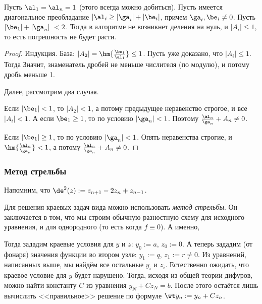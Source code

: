 \documentclass[a4paper]{article}
\begin{document}
\begin{theorem}
Пусть $\al_1 = \al_n=1$ (этого всегда можно добиться). Пусть имеется диагональное преобладание
$|\al_i \ge |\ga_i| + |\be_i|$, причем $\ga_i, \be_i \neq 0$. Пусть $|\be_1| + |\ga_n|\ < 2$.
Тогда в алгоритме не возникнет деления на нуль, и $|A_i|\le 1$, то есть погрешность не будет расти.
\end{theorem}
\begin{proof}
Индукция. База: $|A_2| = \hm{\frac {\be_1}{\al_1}} \le 1$. Пусть уже доказано, что $|A_i|\le1$. Тогда
Значит, знаменатель дробей не меньше числителя (по модулю), и потому дробь меньше 1.

Далее, рассмотрим два случая.

 Если $|\be_1| < 1$, то $|A_2| <1$, а потому предыдущее неравенство строгое, и все $|A_i| < 1$.
А если $\be_1 \ge 1$, то по условию $|\ga_n| < 1$. Поэтому $\frac{\al_n}{\ga_n} + A_n \neq 0$.

 Если $|\be_1| \ge 1$, то по условию $|\ga_n| < 1$. Опять неравенства строгие, и $\hm{\frac{\al_n}{\ga_n}}<1$,
а потому $\frac{\al_n}{\ga_n} + A_n \neq 0$.
\end{proof}

\subsubsection{Метод стрельбы}

Напомним, что $\de^2 (z) := z_{n+1}-2z_n + z_{n-1}$.

Для решения краевых задач вида
можно использовать \emph{метод стрельбы}.
Он заключается в том, что мы строим обычную разностную схему для исходного уравнения, и для однородного (то есть когда $f\equiv 0$).
А именно,

Тогда зададим краевые условия для $y$ и $z$: $y_0 := a$, $z_0 := 0$.
А теперь зададим (от фонаря) значения функции во втором узле:
$y_1 := q$, $z_1 := r \ne 0$.
Из уравнений, написанных выше, мы найдём все остальные $y_i$ и $z_i$. Естественно ожидать, что краевое условие для $y$ будет нарушено.
Тогда, исходя из общей теории дифуров, можно найти  константу $C$ из уравнения $y_N + C z_N = b$.
После этого остаётся лишь вычислить <<правильное>> решение по формуле
$\wt y_n := y_n + C z_n$.
\end{document}
